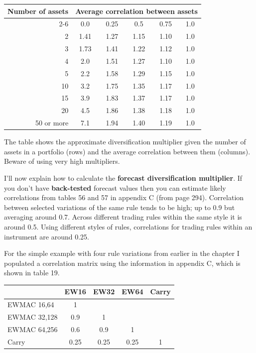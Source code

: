  \begingroup \small \centering \begin{tabular}{@{} rccccc@{}}
\toprule
\textbf{Number of assets} & \multicolumn{5}{c}{\textbf{Average correlation between assets}} \\
\cmidrule(l){2-6}
& 0.0 & 0.25 & 0.5 & 0.75 & 1.0 \\
\midrule
2 & 1.41 & 1.27 & 1.15 & 1.10 & 1.0 \\
3 & 1.73 & 1.41 & 1.22 & 1.12 & 1.0 \\
4 & 2.0 & 1.51 & 1.27 & 1.10 & 1.0 \\
5 & 2.2 & 1.58 & 1.29 & 1.15 & 1.0 \\
10 & 3.2 & 1.75 & 1.35 & 1.17 & 1.0 \\
15 & 3.9 & 1.83 & 1.37 & 1.17 & 1.0 \\
20 & 4.5 & 1.86 & 1.38 & 1.18 & 1.0 \\
50 or more & 7.1 & 1.94 & 1.40 & 1.19 & 1.0 \\
\bottomrule
\end{tabular}
\par \endgroup
{}

The table shows the approximate diversification multiplier given the number of assets in a portfolio (rows) and the average correlation between them (columns). Beware of using very high multipliers.

I'll now explain how to calculate the \textbf{forecast diversification multiplier}. If you don't have \textbf{back-tested} forecast values then you can estimate likely correlations from tables 56 and 57 in appendix C (from page 294). Correlation between selected variations of the same rule tends to be high; up to 0.9 but averaging around 0.7. Across different trading rules within the same style it is around 0.5. Using different styles of rules, correlations for trading rules within an instrument are around 0.25.

For the simple example with four rule variations from earlier in the chapter I populated a correlation matrix using the information in appendix C, which is shown in table 19.

 \begingroup \small \centering \begin{tabular}{@{} lcccc@{}}
\toprule
& EW16 & EW32 & EW64 & Carry \\
\midrule
EWMAC 16,64 & 1 & & & \\
EWMAC 32,128 & 0.9 & 1 & & \\
EWMAC 64,256 & 0.6 & 0.9 & 1 & \\
Carry & 0.25 & 0.25 & 0.25 & 1 \\
\bottomrule
\end{tabular}
\par \endgroup

